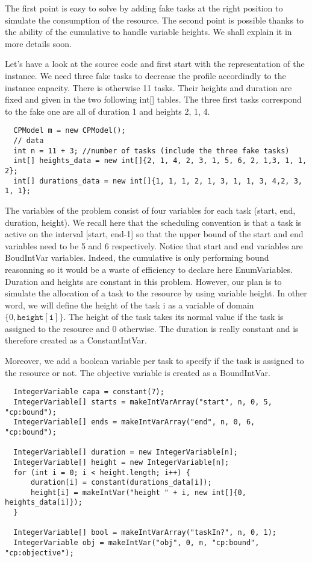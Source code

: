 The first point is easy to solve by adding fake tasks at the right position to simulate the consumption of the resource. The second point is possible thanks to the ability of the cumulative to handle variable heights. We shall explain it in more details soon.

Let's have a look at the source code and first start with the representation of the instance. We need three fake tasks to decrease the profile accordindly to the instance capacity. There is otherwise 11 tasks. Their heights and duration are fixed and given in the two following int[] tables. The three first tasks correspond to the fake one are all of duration 1 and heights 2, 1, 4. 
\begin{lstlisting}
  CPModel m = new CPModel();
  // data
  int n = 11 + 3; //number of tasks (include the three fake tasks)
  int[] heights_data = new int[]{2, 1, 4, 2, 3, 1, 5, 6, 2, 1,3, 1, 1, 2};
  int[] durations_data = new int[]{1, 1, 1, 2, 1, 3, 1, 1, 3, 4,2, 3, 1, 1};
\end{lstlisting}

The variables of the problem consist of four variables for each task (start, end, duration, height). We recall here that the scheduling convention is that a task is active on the interval [start, end-1] so that the upper bound of the start and end variables need to be 5 and 6 respectively. Notice that start and end variables are BoudIntVar variables. Indeed, the cumulative is only performing bound reasonning so it would be a waste of efficiency to declare here EnumVariables. Duration and heights are constant in this problem. However, our plan is to simulate the allocation of a task to the resource by using variable height. In other word, we will define the height of the task i as a variable of domain $\{0, \mathtt{height[i]}\}$. The height of the task takes its normal value if the task is assigned to the resource and 0 otherwise. The duration is really constant and is therefore created as a ConstantIntVar.

Moreover, we add a boolean variable per task to specify if the task is assigned to the resource or not. The objective variable is created as a BoundIntVar. 

\begin{lstlisting}
  IntegerVariable capa = constant(7);
  IntegerVariable[] starts = makeIntVarArray("start", n, 0, 5, "cp:bound");
  IntegerVariable[] ends = makeIntVarArray("end", n, 0, 6, "cp:bound");
  
  IntegerVariable[] duration = new IntegerVariable[n];
  IntegerVariable[] height = new IntegerVariable[n];
  for (int i = 0; i < height.length; i++) {
      duration[i] = constant(durations_data[i]);
      height[i] = makeIntVar("height " + i, new int[]{0, heights_data[i]});
  }
  
  IntegerVariable[] bool = makeIntVarArray("taskIn?", n, 0, 1);
  IntegerVariable obj = makeIntVar("obj", 0, n, "cp:bound", "cp:objective");
\end{lstlisting}

